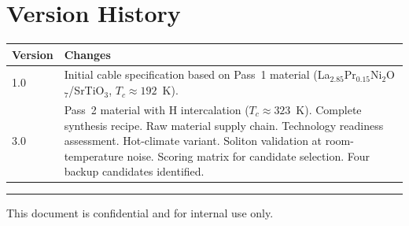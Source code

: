 \documentclass[11pt, a4paper]{article}
\begin{document}
\section{Version History}

\begin{center}
\begin{tabular}{@{}lp{9cm}@{}}
\toprule
\textbf{Version} & \textbf{Changes} \\
\midrule
1.0 & Initial cable specification based on Pass~1 material
      (La$_{2.85}$Pr$_{0.15}$Ni$_2$O$_7$/SrTiO$_3$,
      $T_c \approx 192$~K). \\
3.0 & Pass~2 material with H intercalation
      ($T_c \approx 323$~K). Complete synthesis recipe. Raw material
      supply chain. Technology readiness assessment. Hot-climate
      variant. Soliton validation at room-temperature noise.
      Scoring matrix for candidate selection. Four backup candidates
      identified. \\
\bottomrule
\end{tabular}
\end{center}

\vspace{2em}
\hrule
\vspace{0.5em}
{\color{nm-gray}\small This document is confidential and for internal
use only.}
\end{document}
